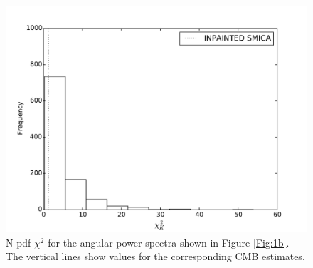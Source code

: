 \begin{figure}
\centering
\includegraphics[width=\textwidth]{figures/chapter-vsk/kchi2.pdf}
\caption{N-pdf $\chi^ 2$ for the angular power spectra shown in Figure \ref{Fig:1b}. The vertical lines show values for the corresponding CMB estimates.}
\label{Fig:2b}
\end{figure}

